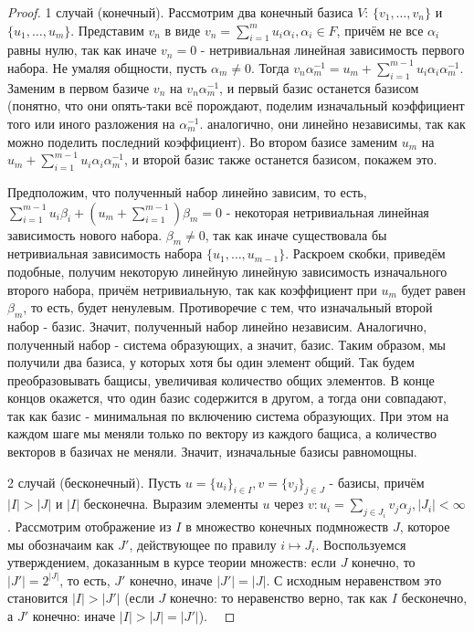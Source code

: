 \documentclass[a4paper,100pt]{article}
\theoremstyle{indented}
\theoremstyle{definition}
\theoremstyle{remark}
\begin{document}
\begin{proof}
    1 случай (конечный). Рассмотрим два конечный базиса $V$: $\{v_1, \dots, v_n\}$ и $\{u_1, \dots , u_m\}$. Представим $v_n$ в виде $v_n=\sum_{i=1}^mu_i\alpha_i, \alpha_i\in F$, причём не все $\alpha_i$ равны нулю, так как иначе $v_n=0$ - нетривиальная линейная зависимость первого набора. Не умаляя общности, пусть $\alpha_m\neq 0$. Тогда $v_n\alpha_m^{-1}=u_m+\sum_{i=1}^{m-1}u_i\alpha_i\alpha_m^{-1}$. Заменим в первом базиче $v_n$ на $v_n\alpha_m^{-1}$, и первый базис останется базисом (понятно, что они опять-таки всё порождают, поделим изначальный коэффициент того или иного разложения на $\alpha_m^{-1}$. аналогично, они линейно независимы, так как можно поделить последний коэффициент). Во втором базисе заменим $u_m$ на $u_m+\sum_{i=1}^{m-1}u_i\alpha_i\alpha_m^{-1}$, и второй базис также останется базисом, покажем это. \ 

    Предположим, что полученный набор линейно зависим, то есть, $\sum_{i=1}^{m-1}u_i\beta_i+(u_m+\sum_{i=1}^{m-1})\beta_m=0$ - некоторая нетривиальная линейная зависимость нового набора. $\beta_m\neq 0$, так как иначе существовала бы нетривиальная зависимость набора $\{u_1, \dots, u_{m-1}\}$. Раскроем скобки, приведём подобные, получим некоторую линейную линейную зависимость изначального второго набора, причём нетривиальную, так как коэффициент при $u_m$ будет равен $\beta_m$, то есть, будет ненулевым. Противоречие с тем, что изначальный второй набор - базис. Значит, полученный набор линейно независим. Аналогично, полученный набор - система образующих, а значит, базис. Таким образом, мы получили два базиса, у которых хотя бы один элемент общий. Так будем преобразовывать бащисы, увеличивая количество общих элементов. В конце концов окажется, что один базис содержится в другом, а тогда они совпадают, так как базис - минимальная по включению система образующих. При этом на каждом шаге мы меняли только по вектору из каждого бащиса, а количество векторов в базичах не меняли. Значит, изначальные базисы равномощны.\ 

    2 случай (бесконечный). Пусть $u=\{u_i\}_{i\in I}, v=\{v_j\}_{j\in J}$ - базисы, причём $\vert I\vert >\vert J\vert $ и $\vert I\vert$ бесконечна. Выразим элементы $u$ через $v:u_i=\sum_{j\in J_i}v_j\alpha_j, \vert J_i\vert<\infty$. Рассмотрим отображение из $I$ в множество конечных подмножеств $J$, которое мы обозначаим как $J'$, действующее по правилу $i\mapsto J_i$. Воспользуемся утверждением, доказанным в курсе теории множеств: если $J$ конечно, то $\vert J'\vert=2^{\vert J\vert}$, то есть, $J'$ конечно, иначе $\vert J'\vert=\vert J\vert$. С исходным неравенством это становится $\vert I\vert>\vert J'\vert$ (если $J$ конечно: то неравенство верно, так как $I$ бесконечно, а $J'$ конечно: иначе $\vert I\vert > \vert J\vert = \vert J'\vert$). \ 


\end{proof}
\end{document}
